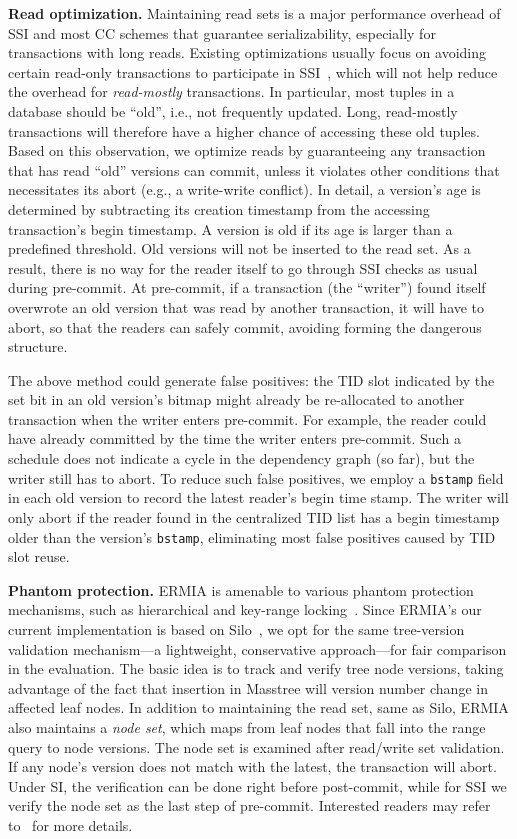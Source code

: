 {\bf Read optimization.}
Maintaining read sets is a major performance overhead of SSI and most CC schemes that guarantee serializability, especially for transactions with long reads. Existing optimizations usually focus on avoiding certain read-only transactions to participate in SSI~\cite{PortsG12}, which will not help reduce the overhead for \textit{read-mostly} transactions. In particular, most tuples in a database should be ``old'', i.e., not frequently updated. Long, read-mostly transactions will therefore have a higher chance of accessing these old tuples. Based on this observation, we optimize reads by guaranteeing any transaction that has read ``old'' versions can commit, unless it violates other conditions that necessitates its abort (e.g., a write-write conflict). In detail, a version's age is determined by subtracting its creation timestamp from the accessing transaction's begin timestamp. A version is old if its age is larger than a predefined threshold. Old versions will not be inserted to the read set. As a result, there is no way for the reader itself to go through SSI checks as usual during pre-commit. At pre-commit, if a transaction (the ``writer'') found itself overwrote an old version that was read by another transaction, it will have to abort, so that the readers can safely commit, avoiding forming the dangerous structure.

The above method could generate false positives: the TID slot indicated by the set bit in an old version's bitmap might already be re-allocated to another transaction when the writer enters pre-commit. For example, the reader could have already committed by the time the writer enters pre-commit. Such a schedule does not indicate a cycle in the dependency graph (so far), but the writer still has to abort. To reduce such false positives, we employ a \texttt{bstamp} field in each old version to record the latest reader's begin time stamp. The writer will only abort if the reader found in the centralized TID list has a begin timestamp older than the version's \texttt{bstamp}, eliminating most false positives caused by TID slot reuse.

{\bf Phantom protection.} ERMIA is amenable to various phantom protection mechanisms, such as hierarchical and key-range locking~\cite{KimuraGK12,Lomet93}. Since ERMIA's our current implementation is based on Silo~\cite{TuZKLM13}, we opt for the same tree-version validation mechanism---a lightweight, conservative approach---for fair comparison in the evaluation. The basic idea is to track and verify tree node versions, taking advantage of the fact that insertion in Masstree will version number change in affected leaf nodes. In addition to maintaining the read set, same as Silo, ERMIA also maintains a \textit{node set}, which maps from leaf nodes that fall into the range query to node versions. The node set is examined after read/write set validation. If any node's version does not match with the latest, the transaction will abort. Under SI, the verification can be done right before post-commit, while for SSI we verify the node set as the last step of pre-commit. Interested readers may refer to~\cite{TuZKLM13} for more details.

